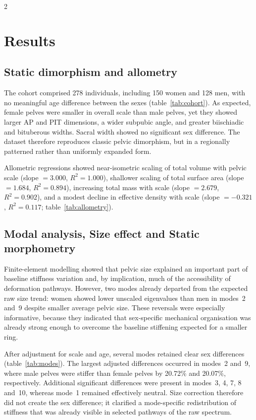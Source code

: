 \documentclass[openacc]{rsproca_new}
\begin{document}
\begin{multicols}{2}
\section{Results}

\subsection{Static dimorphism and allometry}

The cohort comprised 278 individuals, including 150 women and 128 men, with no meaningful age difference between the sexes (table~\ref{tab:cohort}). As expected, female pelves were smaller in overall scale than male pelves, yet they showed larger AP and PIT dimensions, a wider subpubic angle, and greater biischiadic and bituberous widths. Sacral width showed no significant sex difference. The dataset therefore reproduces classic pelvic dimorphism, but in a regionally patterned rather than uniformly expanded form.

Allometric regressions showed near-isometric scaling of total volume with pelvic scale (slope $=3.000$, $R^2=1.000$), shallower scaling of total surface area (slope $=1.684$, $R^2=0.894$), increasing total mass with scale (slope $=2.679$, $R^2=0.902$), and a modest decline in effective density with scale (slope $=-0.321$, $R^2=0.117$; table~\ref{tab:allometry}). 

\subsection{Modal analysis, Size effect and Static morphometry}

Finite-element modelling showed that pelvic size explained an important part of baseline stiffness variation and, by implication, much of the accessibility of deformation pathways.
However, two modes already departed from the expected raw size trend: women showed lower unscaled eigenvalues than men in modes~2 and~9 despite smaller average pelvic size. These reversals were especially informative, because they indicated that sex-specific mechanical organisation was already strong enough to overcome the baseline stiffening expected for a smaller ring.

After adjustment for scale and age, several modes retained clear sex differences (table~\ref{tab:modes}). The largest adjusted differences occurred in modes~2 and~9, where male pelves were stiffer than female pelves by 20.72\% and 20.07\%, respectively. Additional significant differences were present in modes~3, 4, 7, 8 and~10, whereas mode~1 remained effectively neutral. Size correction therefore did not create the sex difference; it clarified a mode-specific redistribution of stiffness that was already visible in selected pathways of the raw spectrum.


\end{multicols}
\end{document}
